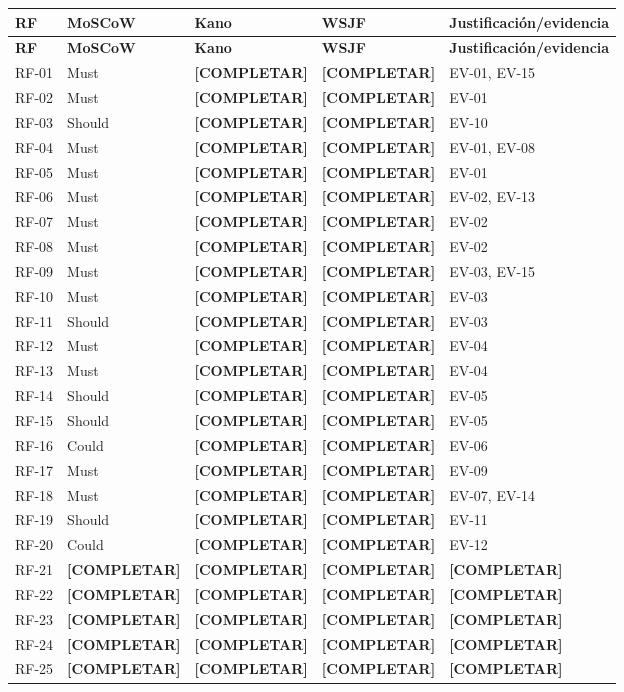 \documentclass[12pt,journal,onecolumn]{IEEEtran}
\newcommand{\completar}{\textcolor{red!70!black}{\textbf{[COMPLETAR]}}}
\begin{document}
\begin{longtable}{P{0.10\textwidth}P{0.16\textwidth}P{0.16\textwidth}P{0.18\textwidth}P{0.32\textwidth}}\toprule
\textbf{RF} & \textbf{MoSCoW} & \textbf{Kano} & \textbf{WSJF} & \textbf{Justificación/evidencia}\\\midrule\endfirsthead
\toprule\textbf{RF} & \textbf{MoSCoW} & \textbf{Kano} & \textbf{WSJF} & \textbf{Justificación/evidencia}\\\midrule\endhead
RF-01 & Must & \completar & \completar & EV-01, EV-15\\
RF-02 & Must & \completar & \completar & EV-01\\
RF-03 & Should & \completar & \completar & EV-10\\
RF-04 & Must & \completar & \completar & EV-01, EV-08\\
RF-05 & Must & \completar & \completar & EV-01\\
RF-06 & Must & \completar & \completar & EV-02, EV-13\\
RF-07 & Must & \completar & \completar & EV-02\\
RF-08 & Must & \completar & \completar & EV-02\\
RF-09 & Must & \completar & \completar & EV-03, EV-15\\
RF-10 & Must & \completar & \completar & EV-03\\
RF-11 & Should & \completar & \completar & EV-03\\
RF-12 & Must & \completar & \completar & EV-04\\
RF-13 & Must & \completar & \completar & EV-04\\
RF-14 & Should & \completar & \completar & EV-05\\
RF-15 & Should & \completar & \completar & EV-05\\
RF-16 & Could & \completar & \completar & EV-06\\
RF-17 & Must & \completar & \completar & EV-09\\
RF-18 & Must & \completar & \completar & EV-07, EV-14\\
RF-19 & Should & \completar & \completar & EV-11\\
RF-20 & Could & \completar & \completar & EV-12\\
RF-21 & \completar & \completar & \completar & \completar\\
RF-22 & \completar & \completar & \completar & \completar\\
RF-23 & \completar & \completar & \completar & \completar\\
RF-24 & \completar & \completar & \completar & \completar\\
RF-25 & \completar & \completar & \completar & \completar\\
\bottomrule\end{longtable}
\end{document}
